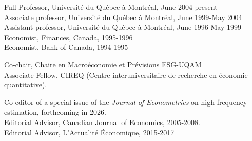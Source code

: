 \noindent Full Professor, Universit\'e du Qu\'ebec \`a Montr\'eal, June 2004-present\\
\noindent Associate professor, Universit\'e du Qu\'ebec \`a Montr\'eal, June 1999-May 2004\\
\noindent Assistant professor, Universit\'e du Qu\'ebec \`a Montr\'eal, June 1996-May 1999\\
\noindent Economist, Finances, Canada, 1995-1996\\
\noindent Economist, Bank of Canada, 1994-1995

\vspace{.5cm}

 \vspace{.3 cm}

\noindent Co-chair, Chaire en Macro\'economie et Pr\'evisions ESG-UQAM\\
\noindent Associate Fellow, CIREQ (Centre interuniversitaire de
recherche en \'economie quantitative).\\

\vspace{.5cm}

 \vspace{.3 cm}


\noindent Co-editor of a special issue of the \textit{Journal of Econometrics} on high-frequency estimation, forthcoming in 2026.\\
\noindent Editorial Advisor, Canadian Journal of Economics,
2005-2008.\\
\noindent Editorial Advisor, L'Actualit\'e \'Economique, 2015-2017

\vspace{.5cm}

\newpage



